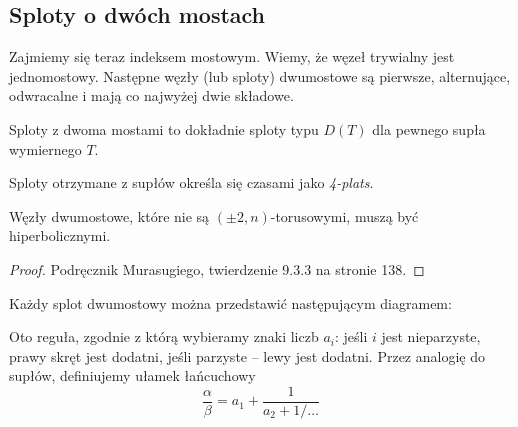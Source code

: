 \subsection{Sploty o dwóch mostach} %
\label{sub:twobridge}

Zajmiemy się teraz indeksem mostowym.
Wiemy, że węzeł trywialny jest jednomostowy.
Następne węzły (lub sploty) dwumostowe są pierwsze, alternujące, odwracalne i mają co najwyżej dwie składowe.

\begin{proposition}
\label{prp:two_bridge_tangle}
	Sploty z dwoma mostami to dokładnie sploty typu $D(T)$ dla pewnego supła wymiernego $T$.
\end{proposition}

Sploty otrzymane z supłów określa się czasami jako \emph{4-plats}.

\begin{proposition}
\label{prp:two_bridge_hyperbolic}
	Węzły dwumostowe, które nie są $(\pm 2, n)$-torusowymi, muszą być hiperbolicznymi.
\end{proposition}

\begin{proof}
	Podręcznik \cite{murasugi96} Murasugiego, twierdzenie 9.3.3 na stronie 138.
\end{proof}


Każdy splot dwumostowy można przedstawić następującym diagramem:



Oto reguła, zgodnie z którą wybieramy znaki liczb $a_i$:
jeśli $i$ jest nieparzyste, prawy skręt jest dodatni, jeśli parzyste -- lewy jest dodatni.
Przez analogię do supłów, definiujemy ułamek łańcuchowy
\[
	\frac \alpha \beta = a_1 + \frac{1}{a_2 + 1/\ldots}
\]

